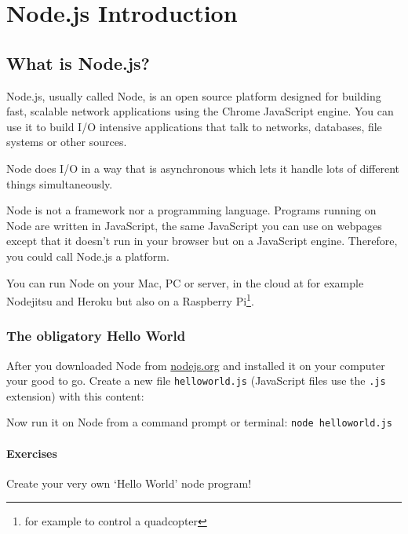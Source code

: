 \documentclass[a4paper]{report}
\begin{document}
 
 
\chapter*{\textcolor{seccol}{Node.js} Introduction} 
 
\section*{What is Node.js?} 
Node.js, usually called Node, is an open source platform designed for building fast, scalable network applications using the Chrome JavaScript engine. You can use it to build I/O intensive applications that talk to networks, databases, file systems or other sources. 
 
Node does I/O in a way that is asynchronous which lets it handle lots of different things simultaneously. 
 
Node is not a framework nor a programming language. Programs running on Node are written in JavaScript, the same JavaScript you can use on webpages except that it doesn't run in your browser but on a JavaScript engine. Therefore, you could call Node.js a platform. 
 
You can run Node on your Mac, PC or server, in the cloud at for example Nodejitsu and Heroku but also on a Raspberry Pi\footnote{for example to control a quadcopter}. 
 
\subsection*{The obligatory Hello World} 
 
After you downloaded Node from \href{http://nodejs.org}{nodejs.org} and installed it on your computer your good to go. Create a new file \texttt{helloworld.js} (JavaScript files use the \texttt{.js} extension) with this content: 
 
 
 
\noindent Now run it on Node from a command prompt or terminal: \colorbox{codecol}{\lstinline[language=bash]{node helloworld.js}} 
 
\subsubsection*{Exercises} 
Create your very own `Hello World' node program! 
 
\end{document}
